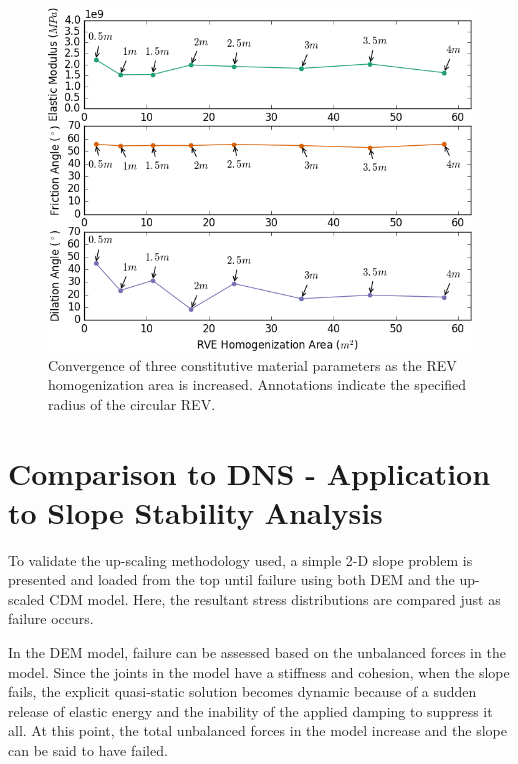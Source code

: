 \begin{figure}[!htb]
\begin{center}
\includegraphics[width=\textwidth]{figures/Chapter5/REVAnalysis}
\caption{{\label{fig:revconverge} Convergence of three constitutive material parameters as the REV homogenization area is increased. Annotations indicate the specified radius of the circular REV.%
}}
\end{center}
\end{figure}

\section{Comparison to DNS - Application to Slope Stability Analysis}

To validate the up-scaling methodology used, a simple 2-D slope problem is presented and loaded from the top until failure using both DEM and the up-scaled CDM model. Here, the resultant stress distributions are compared just as failure occurs. 

In the DEM model, failure can be assessed based on the unbalanced forces in the model. Since the joints in the model have a stiffness and cohesion, when the slope fails, the explicit quasi-static solution becomes dynamic because of a sudden release of elastic energy and the inability of the applied damping to suppress it all. At this point, the total unbalanced forces in the model increase and the slope can be said to have failed. 

